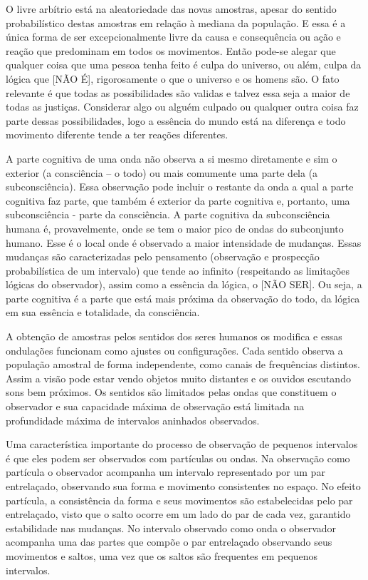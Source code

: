 O livre arbítrio está na aleatoriedade das novas amostras, apesar do sentido probabilístico destas amostras em relação à mediana da população. E essa é a única forma de ser excepcionalmente livre da causa e consequência ou ação e reação que predominam em todos os movimentos. Então pode-se alegar que qualquer coisa que uma pessoa tenha feito é culpa do universo, ou além, culpa da lógica que [NÃO É], rigorosamente o que o universo e os homens são. O fato relevante é que todas as possibilidades são validas e talvez essa seja a maior de todas as justiças. Considerar algo ou alguém culpado ou qualquer outra coisa faz parte dessas possibilidades, logo a essência do mundo está na diferença e todo movimento diferente tende a ter reações diferentes. 

A parte cognitiva de uma onda não observa a si mesmo diretamente e sim o exterior (a consciência – o todo) ou mais comumente uma parte dela (a subconsciência). Essa observação pode incluir o restante da onda a qual a parte cognitiva faz parte, que também é exterior da parte cognitiva e, portanto, uma subconsciência - parte da consciência. A parte cognitiva da subconsciência humana é, provavelmente, onde se tem o maior pico de ondas do subconjunto humano. Esse é o local onde é observado a maior intensidade de mudanças. Essas mudanças são caracterizadas pelo pensamento (observação e prospecção probabilística de um intervalo) que tende ao infinito (respeitando as limitações lógicas do observador), assim como a essência da lógica, o [NÃO SER]. Ou seja, a parte cognitiva é a parte que está mais próxima da observação do todo, da lógica em sua essência e totalidade, da consciência.

A obtenção de amostras pelos sentidos dos seres humanos os modifica e essas ondulações funcionam como ajustes ou configurações. Cada sentido observa a população amostral de forma independente, como canais de frequências distintos. Assim a visão pode estar vendo objetos muito distantes e os ouvidos escutando sons bem próximos. Os sentidos são limitados pelas ondas que constituem o observador e sua capacidade máxima de observação está limitada na profundidade máxima de intervalos aninhados observados.

Uma característica importante do processo de observação de pequenos intervalos é que eles podem ser observados com partículas ou ondas. Na observação como partícula o observador acompanha um intervalo representado por um par entrelaçado, observando sua forma e movimento consistentes no espaço. No efeito partícula, a consistência da forma e seus movimentos são estabelecidas pelo par entrelaçado, visto que o salto ocorre em um lado do par de cada vez, garantido estabilidade nas mudanças. No intervalo observado como onda o observador acompanha uma das partes que compõe o par entrelaçado observando seus movimentos e saltos, uma vez que os saltos são frequentes em pequenos intervalos.

